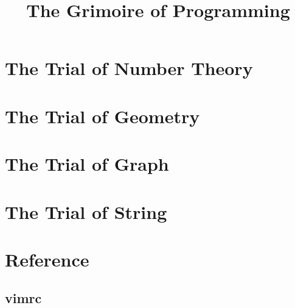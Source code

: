 \documentclass[a4paper]{report}
\title{The Grimoire of Programming}
\date{}
\author{}
\begin{document}
	\maketitle
	\chapter{The Trial of Number Theory}
		
	\chapter{The Trial of Geometry}
		
	\chapter{The Trial of Graph}
		
	\chapter{The Trial of String}
		
	\chapter{Reference}
		\section{vimrc}
			
\end{document}
